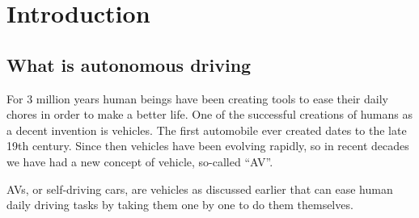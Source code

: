 
\chapter{Introduction}
\label{ch1}

\section{What is autonomous driving}
For 3 million years human beings have been creating tools to ease their daily chores in order to make a better life. One of the successful creations of humans as a decent invention is vehicles. The first automobile ever created dates to the late 19th century. Since then vehicles have been evolving rapidly, so in recent decades we have had a new concept of vehicle, so-called \enquote{\ac{AV}}.

\acsp{AV}, or self-driving cars, are vehicles as discussed earlier that can ease human daily driving tasks by taking them one by one to do them themselves.

